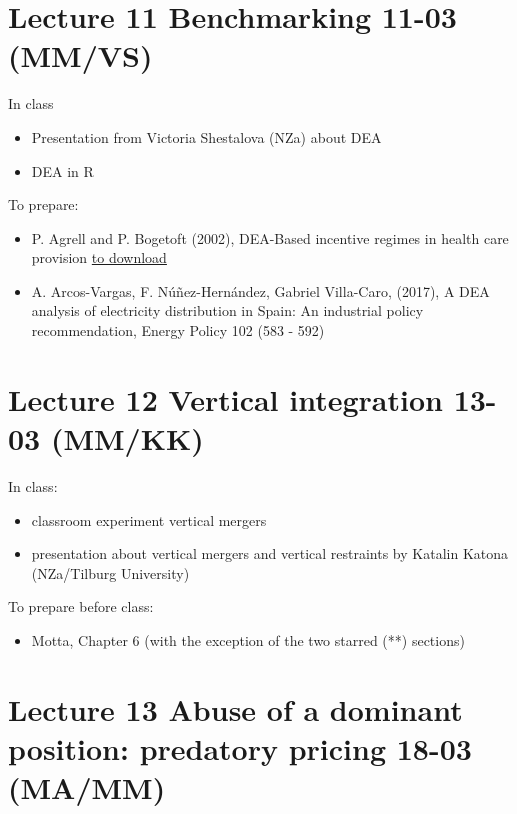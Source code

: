 \documentclass[]{book}
\providecommand{\tightlist}{%
  \setlength{\itemsep}{0pt}\setlength{\parskip}{0pt}}
\begin{document}
\section{Lecture 11 Benchmarking 11-03
(MM/VS)}\label{lecture-11-benchmarking-11-03-mmvs}

In class

\begin{itemize}
\tightlist
\item
  Presentation from Victoria Shestalova (NZa) about DEA
\item
  DEA in R
\end{itemize}

To prepare:

\begin{itemize}
\tightlist
\item
  P. Agrell and P. Bogetoft (2002), DEA-Based incentive regimes in
  health care provision
  \href{https://www.researchgate.net/profile/Peter_Bogetoft/publication/23515165_DEA-Based_Incentive_Regimes_in_Health-Care_Provision/links/0912f50ae2f961fe8b000000.pdf}{to
  download}
\item
  A. Arcos-Vargas, F. Núñez-Hernández, Gabriel Villa-Caro, (2017), A DEA
  analysis of electricity distribution in Spain: An industrial policy
  recommendation, Energy Policy 102 (583 - 592)
\end{itemize}

\section{Lecture 12 Vertical integration 13-03
(MM/KK)}\label{lecture-12-vertical-integration-13-03-mmkk}

In class:

\begin{itemize}
\tightlist
\item
  classroom experiment vertical mergers
\item
  presentation about vertical mergers and vertical restraints by Katalin
  Katona (NZa/Tilburg University)
\end{itemize}

To prepare before class:

\begin{itemize}
\tightlist
\item
  Motta, Chapter 6 (with the exception of the two starred (**) sections)
\end{itemize}

\section{Lecture 13 Abuse of a dominant position: predatory pricing
18-03
(MA/MM)}\label{lecture-13-abuse-of-a-dominant-position-predatory-pricing-18-03-mamm}
\end{document}
